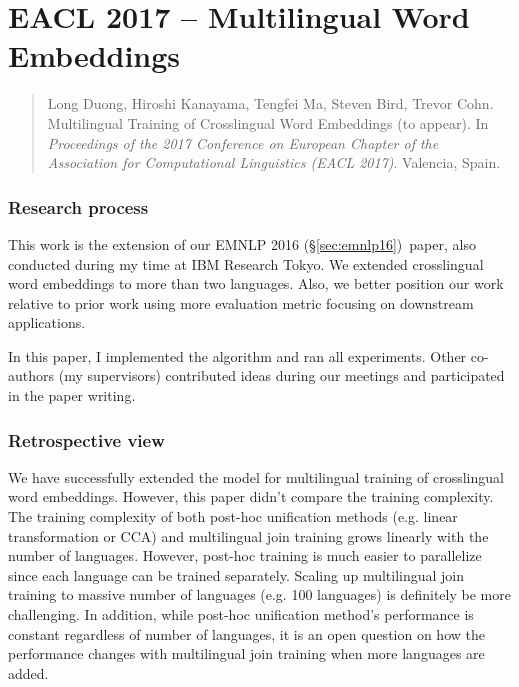 \documentclass[12pt,twoside,final,hidelinks]{ltthesis}
\theoremstyle{definition}
\newcommand\emnlpvi{EMNLP 2016 (\S\ref{sec:emnlp16})}
\begin{document}



\section{EACL 2017 -- Multilingual Word Embeddings}
\label{sec:eacl17}
\begin{quote}
Long Duong, Hiroshi Kanayama, Tengfei Ma, Steven Bird, Trevor Cohn. Multilingual Training of Crosslingual Word Embeddings (to appear). In \textit{Proceedings of the 2017 Conference on European Chapter of the Association for Computational Linguistics (EACL 2017)}. Valencia, Spain. 
\end{quote}

\subsubsection{Research process}
This work is the extension of our \emnlpvi\ paper, also conducted during my time at IBM Research Tokyo. We extended crosslingual word embeddings to more than two languages. Also, we better position our work relative to prior work using more evaluation metric focusing on downstream applications. 

In this paper, I implemented the algorithm and ran all experiments. Other co-authors (my supervisors) contributed ideas during our meetings and participated in the paper writing. 

\subsubsection{Retrospective view}
We have successfully extended the model for multilingual training of crosslingual word embeddings. However, this paper didn't compare the training complexity. 
The training complexity of both post-hoc unification methods (e.g. linear transformation or CCA) and multilingual join training grows linearly with the 
number of languages. However, post-hoc training is much easier to parallelize since each language can be trained separately. Scaling up multilingual join 
training to massive number of languages (e.g. 100 languages) is definitely be more challenging. In addition, while post-hoc unification method's performance 
is constant regardless of number of languages, it is an open question on how the performance changes with multilingual join training when  more languages are added. 
\end{document}
